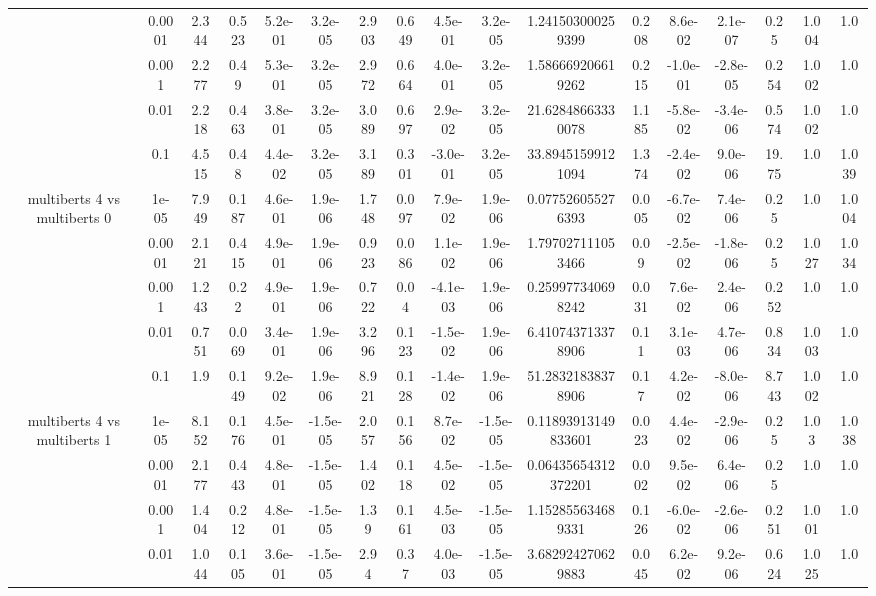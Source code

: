 \begin{tabular}{|c|c|c|c|c|c|c|c|c|c|c|c|c|c|c|c|c|}
 & 0.0001 & 2.344 & 0.523 & 5.2e-01 & 3.2e-05 & 2.903 & 0.649 & 4.5e-01 & 3.2e-05 & 1.241503000259399 & 0.208 & 8.6e-02 & 2.1e-07 & 0.25 & 1.004 & 1.0 \\
 & 0.001 & 2.277 & 0.49 & 5.3e-01 & 3.2e-05 & 2.972 & 0.664 & 4.0e-01 & 3.2e-05 & 1.586669206619262 & 0.215 & -1.0e-01 & -2.8e-05 & 0.254 & 1.002 & 1.0 \\
 & 0.01 & 2.218 & 0.463 & 3.8e-01 & 3.2e-05 & 3.089 & 0.697 & 2.9e-02 & 3.2e-05 & 21.62848663330078 & 1.185 & -5.8e-02 & -3.4e-06 & 0.574 & 1.002 & 1.0 \\
 & 0.1 & 4.515 & 0.48 & 4.4e-02 & 3.2e-05 & 3.189 & 0.301 & -3.0e-01 & 3.2e-05 & 33.89451599121094 & 1.374 & -2.4e-02 & 9.0e-06 & 19.75 & 1.0 & 1.039 \\
\hline
\multirow{5}{*}{multiberts 4 vs multiberts 0} & 1e-05 & 7.949 & 0.187 & 4.6e-01 & 1.9e-06 & 1.748 & 0.097 & 7.9e-02 & 1.9e-06 & 0.077526055276393 & 0.005 & -6.7e-02 & 7.4e-06 & 0.25 & 1.0 & 1.004 \\
 & 0.0001 & 2.121 & 0.415 & 4.9e-01 & 1.9e-06 & 0.923 & 0.086 & 1.1e-02 & 1.9e-06 & 1.797027111053466 & 0.09 & -2.5e-02 & -1.8e-06 & 0.25 & 1.027 & 1.034 \\
 & 0.001 & 1.243 & 0.22 & 4.9e-01 & 1.9e-06 & 0.722 & 0.04 & -4.1e-03 & 1.9e-06 & 0.259977340698242 & 0.031 & 7.6e-02 & 2.4e-06 & 0.252 & 1.0 & 1.0 \\
 & 0.01 & 0.751 & 0.069 & 3.4e-01 & 1.9e-06 & 3.296 & 0.123 & -1.5e-02 & 1.9e-06 & 6.410743713378906 & 0.11 & 3.1e-03 & 4.7e-06 & 0.834 & 1.003 & 1.0 \\
 & 0.1 & 1.9 & 0.149 & 9.2e-02 & 1.9e-06 & 8.921 & 0.128 & -1.4e-02 & 1.9e-06 & 51.28321838378906 & 0.17 & 4.2e-02 & -8.0e-06 & 8.743 & 1.002 & 1.0 \\
\hline
\multirow{5}{*}{multiberts 4 vs multiberts 1} & 1e-05 & 8.152 & 0.176 & 4.5e-01 & -1.5e-05 & 2.057 & 0.156 & 8.7e-02 & -1.5e-05 & 0.11893913149833601 & 0.023 & 4.4e-02 & -2.9e-06 & 0.25 & 1.03 & 1.038 \\
 & 0.0001 & 2.177 & 0.443 & 4.8e-01 & -1.5e-05 & 1.402 & 0.118 & 4.5e-02 & -1.5e-05 & 0.06435654312372201 & 0.002 & 9.5e-02 & 6.4e-06 & 0.25 & 1.0 & 1.0 \\
 & 0.001 & 1.404 & 0.212 & 4.8e-01 & -1.5e-05 & 1.39 & 0.161 & 4.5e-03 & -1.5e-05 & 1.152855634689331 & 0.126 & -6.0e-02 & -2.6e-06 & 0.251 & 1.001 & 1.0 \\
 & 0.01 & 1.044 & 0.105 & 3.6e-01 & -1.5e-05 & 2.94 & 0.37 & 4.0e-03 & -1.5e-05 & 3.682924270629883 & 0.045 & 6.2e-02 & 9.2e-06 & 0.624 & 1.025 & 1.0 \\

\end{tabular}
